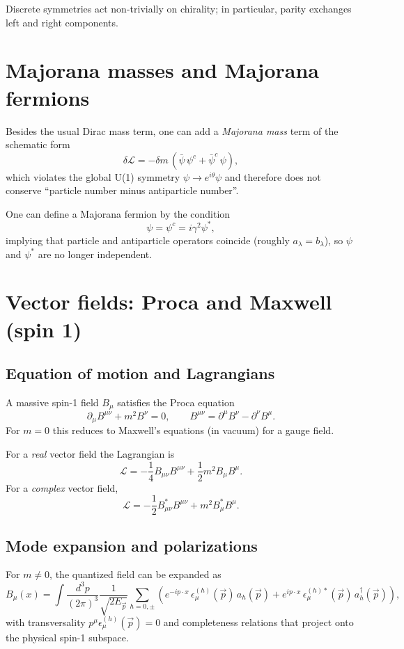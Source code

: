 Discrete symmetries act non-trivially on chirality; in particular, parity exchanges left and right components.

\section{Majorana masses and Majorana fermions}
Besides the usual Dirac mass term, one can add a \emph{Majorana mass} term of the schematic form
\begin{equation}
\delta\mathcal L = -\delta m\,(\bar\psi\,\psi^c+\bar\psi^c\,\psi),
\end{equation}
which violates the global U(1) symmetry $\psi\to e^{i\theta}\psi$ and therefore does not conserve
``particle number minus antiparticle number''.

One can define a Majorana fermion by the condition
\begin{equation}
\psi=\psi^c=i\gamma^2\psi^\ast,
\end{equation}
implying that particle and antiparticle operators coincide (roughly $a_\lambda=b_\lambda$), so $\psi$ and $\psi^\ast$
are no longer independent.

\section{Vector fields: Proca and Maxwell (spin 1)}
\subsection{Equation of motion and Lagrangians}
A massive spin-1 field $B_\mu$ satisfies the Proca equation
\begin{equation}
\partial_\mu B^{\mu\nu}+m^2 B^\nu=0,\qquad B^{\mu\nu}=\partial^\mu B^\nu-\partial^\nu B^\mu.
\end{equation}
For $m=0$ this reduces to Maxwell's equations (in vacuum) for a gauge field.

For a \emph{real} vector field the Lagrangian is
\begin{equation}
\mathcal L = -\frac14 B_{\mu\nu}B^{\mu\nu}+\frac12 m^2 B_\mu B^\mu.
\end{equation}
For a \emph{complex} vector field,
\begin{equation}
\mathcal L = -\frac12 B_{\mu\nu}^\ast B^{\mu\nu}+ m^2 B_\mu^\ast B^\mu.
\end{equation}

\subsection{Mode expansion and polarizations}
For $m\neq 0$, the quantized field can be expanded as
\begin{equation}
B_\mu(x)=\int\frac{d^3p}{(2\pi)^3}\frac{1}{\sqrt{2E_{\vec p}}}
\sum_{h=0,\pm}\left(
e^{-ip\cdot x}\,\epsilon_\mu^{(h)}(\vec p)\,a_h(\vec p)
+
e^{ip\cdot x}\,\epsilon_\mu^{(h)\ast}(\vec p)\,a_h^\dagger(\vec p)
\right),
\end{equation}
with transversality $p^\mu \epsilon_\mu^{(h)}(\vec p)=0$ and completeness relations that project onto the physical
spin-1 subspace.

